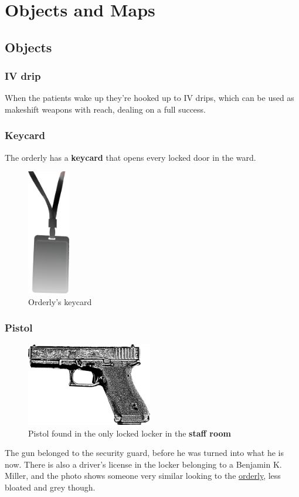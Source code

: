 \section{Objects and Maps}%
\label{sec:objects_and_maps}

\twocolumn
\subsection{Objects}%
\label{sub:objects}

\subsubsection{IV drip}%
\label{ssub:iv_drip}

When the patients wake up they're hooked up to IV drips, which can be used as makeshift weapons with reach, dealing 
on a full success.

\subsubsection{Keycard}%
\label{ssub:keycard}

The orderly has a \textbf{keycard} that opens every locked door in the ward.
\begin{figure}[!htbp]
  \includegraphics[height=5.5cm, keepaspectratio]{resources/img/keycard.png}
  \caption{Orderly's keycard}\label{keycard}
\end{figure}

\subsubsection{Pistol}%
\label{ssub:pistol}

\begin{figure}[!htbp]
  \includegraphics[width=5.5cm, keepaspectratio]{resources/img/glock.png}
  \caption{Pistol found in the only locked locker in the \textbf{staff room}}\label{pistol}
\end{figure}
The gun belonged to the security guard, before he was turned into what he is now.  There is also a driver's license in the
locker belonging to a Benjamin K. Miller, and the photo shows someone very similar looking to the
\hyperref[ssub:orderly]{orderly}, less bloated and grey though.


